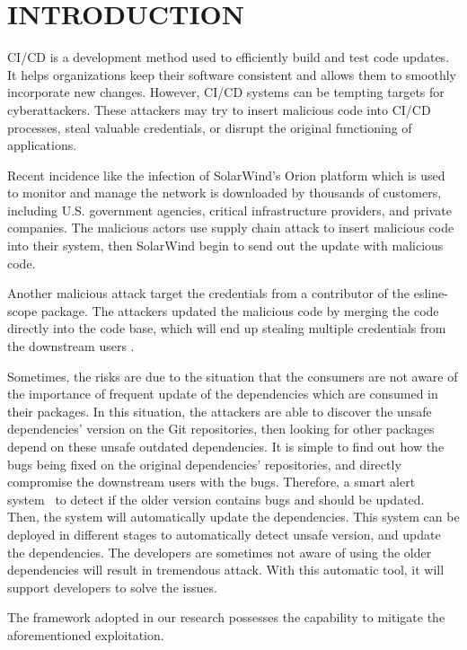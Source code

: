 \section{INTRODUCTION}
CI/CD is a development method used to efficiently build and test code updates. 
It helps organizations keep their software consistent and allows them to smoothly 
incorporate new changes. However, CI/CD systems can be tempting targets for cyberattackers. 
These attackers may try to insert malicious code into CI/CD processes, 
steal valuable credentials, or disrupt the original functioning of applications\cite{sonatype2020}.

Recent incidence like the infection of SolarWind's Orion platform \cite{ladisa2023sok, 
peisert2021perspectives} which is used to monitor and manage the network is downloaded by 
thousands of customers, including U.S. government agencies, critical infrastructure providers, 
and private companies. The malicious actors use supply chain attack to insert malicious code into their system,
then SolarWind begin to send out the update with malicious code. 

Another malicious attack target the credentials from a contributor of the esline-scope package.
The attackers updated the malicious code by merging the code directly into the code base, which will end up stealing
multiple credentials from the downstream users \cite{eslint2018}.

Sometimes, the risks are due to the situation that the consumers are not aware of the importance 
of frequent update of the dependencies which are consumed in their packages. In this situation,
the attackers are able to discover the unsafe dependencies' version on the Git repositories, then looking for
other packages depend on these unsafe outdated dependencies. It is simple to find out how the bugs being
fixed on the original dependencies' repositories, and directly compromise the downstream users with the bugs.
Therefore, a smart alert system~\cite{wang2020empirical} to detect if the older version contains
bugs and should be updated. Then, the system will automatically update the dependencies. This system can be deployed
in different stages to automatically detect unsafe version, and update the dependencies. The developers 
are sometimes not aware of using the older dependencies will result in tremendous attack. With this automatic tool,
it will support developers to solve the issues.

The framework adopted in our research possesses the capability to mitigate the aforementioned exploitation. 

